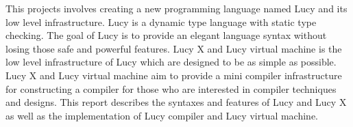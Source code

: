 
This projects involves creating a new programming language named Lucy and its low level infrastructure. Lucy is a dynamic type language with static type checking. The goal of Lucy is to provide an elegant language syntax without losing those safe and powerful features. Lucy X and Lucy virtual machine is the low level infrastructure of Lucy which are designed to be as simple as possible. Lucy X and Lucy virtual machine aim to provide a mini compiler infrastructure for constructing a compiler for those who are interested in compiler techniques and designs. This report describes the syntaxes and features of Lucy and Lucy X as well as the implementation of Lucy compiler and Lucy virtual machine.
